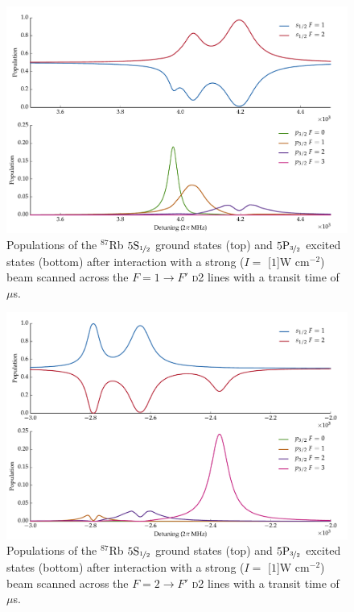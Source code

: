     \begin{figure}%
    \includegraphics[width=\linewidth]{figs/05_twophoton/rb87_d2_hf_solve_scan_g3a_fig1.pdf}
    \caption{
    Populations of the $^{87}$Rb $5\rm{S}_{\nicefrac{1}{2}}$ ground states
    (top) and $5\rm{P}_{\nicefrac{3}{2}}$ excited states (bottom) after
    interaction with a strong ($I = $ \unit[$1$]{W cm$^{-2}$}) beam scanned
    across the $F = 1 \rightarrow F'$ \textsc{d2} lines with a transit time of
    \unit[2]{$\mu$s}.
    }
    \label{fig:strong_d2_f1} 
    \end{figure}

    \begin{figure}%
    \includegraphics[width=\linewidth]{figs/05_twophoton/rb87_d2_hf_solve_scan_h2a_fig1.pdf}
    \caption{
    Populations of the $^{87}$Rb $5\rm{S}_{\nicefrac{1}{2}}$ ground states
    (top) and $5\rm{P}_{\nicefrac{3}{2}}$ excited states (bottom) after
    interaction with a strong ($I = $ \unit[$1$]{W cm$^{-2}$}) beam scanned
    across the $F = 2 \rightarrow F'$ \textsc{d2} lines with a transit time of
    \unit[2]{$\mu$s}.
    }
    \label{fig:strong_d2_f2} 
    \end{figure}

